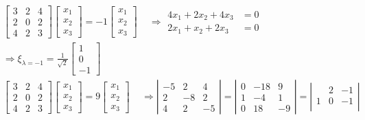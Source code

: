 \documentclass[twoside]{amsart}
\theoremstyle{plain}
\theoremstyle{definition}
\begin{document}
\[
\begin{aligned}
  & \left[ \begin{matrix} 3 & 2 & 4 \\ 2 & 0 & 2 \\ 4 & 2 & 3 \end{matrix} \right] \left[ \begin{matrix} x_1 \\ x_2 \\ x_3 \end{matrix} \right] = -1 \left[ \begin{matrix} x_1 \\ x_2 \\ x_3 \end{matrix} \right] \quad \, \Longrightarrow \begin{aligned} 4 x_1 + 2 x_2 + 4 x_3 & = 0 \\ 2 x_1 + x_2 + 2x_3 & = 0 \end{aligned} \quad \, \\
  & \Longrightarrow \xi_{\lambda =-1}  = \frac{1}{\sqrt{2}} \left[ \begin{matrix} 1 \\ 0 \\ -1 \end{matrix} \right] \\
  & \left[ \begin{matrix} 3 & 2 & 4 \\ 2 & 0 & 2 \\ 4 & 2 & 3 \end{matrix} \right] \left[ \begin{matrix} x_1 \\ x_2 \\ x_3 \end{matrix} \right] = 9 \left[ \begin{matrix} x_1 \\ x_2 \\ x_3 \end{matrix} \right] \quad \, \Longrightarrow \left| \begin{matrix} -5 & 2 & 4 \\ 2 & -8 & 2 \\ 4 & 2 & -5 \end{matrix} \right| = \left| \begin{matrix} 0 & -18 & 9 \\ 1 & -4 & 1 \\ 0 & 18 & -9 \end{matrix} \right| = \left| \begin{matrix} & 2 & -1 \\ 1 & 0 & -1 \\ & & \end{matrix} \right| \\

\end{aligned}\]
\end{document}
